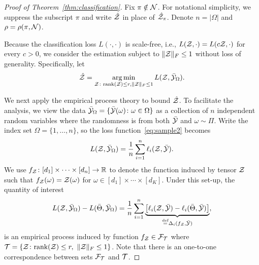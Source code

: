 \documentclass[11pt]{article}
\theoremstyle{plain}
\theoremstyle{definition}
\newcommand*{\KeepStyleUnderBrace}[1]{%
  \mathop{%
    \mathchoice
    {\underbrace{\displaystyle#1}}%
    {\underbrace{\textstyle#1}}%
    {\underbrace{\scriptstyle#1}}%
    {\underbrace{\scriptscriptstyle#1}}%
  }\limits
}
\def\rank{\textup{rank}}
\begin{document}
\begin{proof}[Proof of Theorem~\ref{thm:classification}]
Fix $\pi\notin\mathcal{N}$. For notational simplicity, we suppress the subscript $\pi$ and write $\hat {\mathcal{Z}}$ in place of $\hat {\mathcal{Z}}_\pi$. Denote $n=|\Omega|$ and $\rho=\rho(\pi, \mathcal{N})$. 

Because the classification loss $L(\cdot, \cdot)$ is scale-free, i.e., $L(\mathcal{Z},\cdot)=L(c\mathcal{Z}, \cdot)$ for every $c>0$, we consider the estimation subject to $\lVert\mathcal{Z}\rVert_F\leq 1$ without loss of generality. Specifically, let
\[
\hat {\mathcal{Z}}=\operatorname*{arg\,min}_{\mathcal{Z}\colon \textup{rank}(\mathcal{Z})\leq r, \lVert\mathcal{Z}\rVert_F\leq 1}L(\mathcal{Z}, \bar {\mathcal{Y}}_{\Omega}).
\]

We next apply the empirical process theory to bound $\hat {\mathcal{Z}}$. To facilitate the analysis, we view the data $\bar {\mathcal{Y}}_\Omega=\{\bar {\mathcal{Y}}(\omega)\colon \omega\in \Omega\}$ as a collection of $n$ independent random variables where the randomness is from both $\bar {\mathcal{Y}}$ and $\omega\sim\Pi$. Write the index set $\Omega=\{1,\ldots,n\}$, so the loss function~\eqref{eq:sample2} becomes
\[
L(\mathcal{Z},\bar {\mathcal{Y}}_\Omega)={1\over n}\sum_{i=1}^n\ell_{i}(\mathcal{Z}, \bar {\mathcal{Y}}).
\]
We use $f_{\mathcal{Z}} \colon [d_1]\times\cdots\times[d_n] \to \mathbb{R}$ to denote the function induced by tensor $\mathcal{Z}$ such that $f_{\mathcal{Z}}(\omega)=\mathcal{Z}(\omega)$ for $\omega\in[d_1]\times \cdots \times [d_K]$. Under this set-up, the quantity of interest
\begin{align}\label{eq:empirical}
 L(\tZ,\bar \tY_\Omega)-L(\bar \Theta,\bar \tY_\Omega)={1\over n}\sum_{i=1}^n \KeepStyleUnderBrace{\left[\ell_{i}(\tZ, \bar \tY)-\ell_{i}(\bar \Theta, \bar \tY)\right]}_{\stackrel{\text{def}}{=}\Delta_i(f_\tZ,\bar \tY)},
\end{align}
is an empirical process induced by function $f_{\mathcal{Z}}\in \mathcal{F}_{\mathcal{T}}$ where $\tT=\{\tZ\colon \rank(\tZ)\leq r, \ \FnormSize{}{\tZ}\leq 1\}$. Note that there is an one-to-one correspondence between sets $\mathcal{F}_{\mathcal{T}}$ and $\mathcal{T}$. 


\end{proof}
\end{document}
